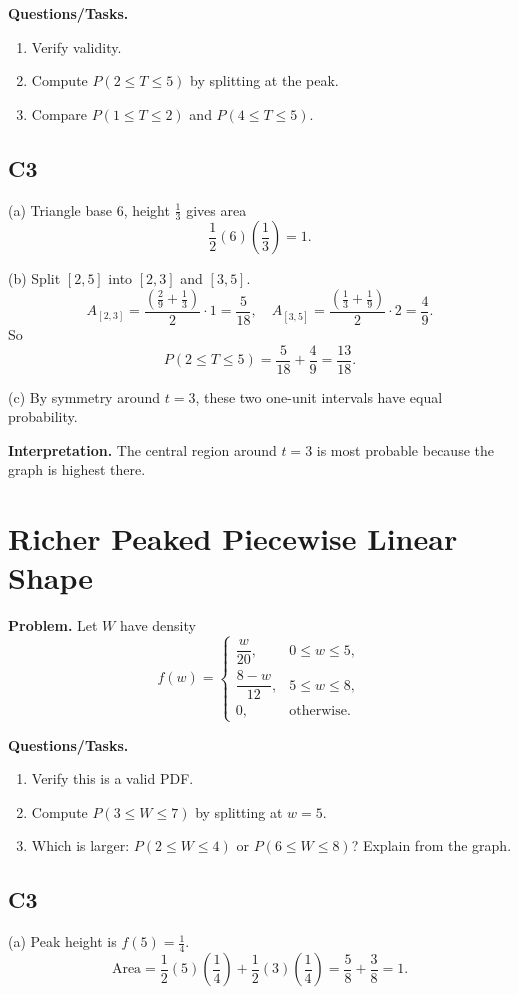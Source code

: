 \textbf{Questions/Tasks.}
\begin{enumerate}[label=(\alph*)]
\item Verify validity.
\item Compute $P(2\le T\le 5)$ by splitting at the peak.
\item Compare $P(1\le T\le 2)$ and $P(4\le T\le 5)$.
\end{enumerate}

\subsection*{C3}
(a) Triangle base $6$, height $\frac13$ gives area
\[
\frac12(6)\left(\frac13\right)=1.
\]

(b) Split $[2,5]$ into $[2,3]$ and $[3,5]$.
\[
A_{[2,3]}=\frac{\left(\frac29+\frac13\right)}{2}\cdot1=\frac{5}{18},
\quad
A_{[3,5]}=\frac{\left(\frac13+\frac19\right)}{2}\cdot2=\frac{4}{9}.
\]
So
\[
P(2\le T\le 5)=\frac{5}{18}+\frac{4}{9}=\frac{13}{18}.
\]

(c) By symmetry around $t=3$, these two one-unit intervals have equal probability.

\textbf{Interpretation.}
The central region around $t=3$ is most probable because the graph is highest there.

\section{Richer Peaked Piecewise Linear Shape}

\textbf{Problem.}
Let $W$ have density
\[
f(w)=\begin{cases}
\dfrac{w}{20}, & 0\le w\le 5,\\
\dfrac{8-w}{12}, & 5\le w\le 8,\\
0, & \text{otherwise.}
\end{cases}
\]

\textbf{Questions/Tasks.}
\begin{enumerate}[label=(\alph*)]
\item Verify this is a valid PDF.
\item Compute $P(3\le W\le 7)$ by splitting at $w=5$.
\item Which is larger: $P(2\le W\le 4)$ or $P(6\le W\le 8)$? Explain from the graph.
\end{enumerate}

\subsection*{C3}
(a) Peak height is $f(5)=\frac14$.
\[
\text{Area}=\frac12(5)\left(\frac14\right)+\frac12(3)\left(\frac14\right)=\frac58+\frac38=1.
\]

